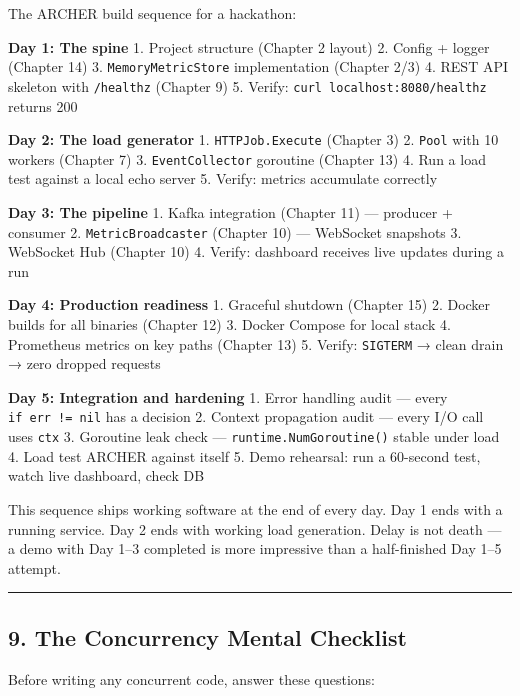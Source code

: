 \documentclass[
]{article}
\begin{document}
The ARCHER build sequence for a hackathon:

\textbf{Day 1: The spine} 1. Project structure (Chapter 2 layout) 2.
Config + logger (Chapter 14) 3. \texttt{MemoryMetricStore}
implementation (Chapter 2/3) 4. REST API skeleton with \texttt{/healthz}
(Chapter 9) 5. Verify: \texttt{curl\ localhost:8080/healthz} returns 200

\textbf{Day 2: The load generator} 1. \texttt{HTTPJob.Execute} (Chapter
3) 2. \texttt{Pool} with 10 workers (Chapter 7) 3.
\texttt{EventCollector} goroutine (Chapter 13) 4. Run a load test
against a local echo server 5. Verify: metrics accumulate correctly

\textbf{Day 3: The pipeline} 1. Kafka integration (Chapter 11) ---
producer + consumer 2. \texttt{MetricBroadcaster} (Chapter 10) ---
WebSocket snapshots 3. WebSocket Hub (Chapter 10) 4. Verify: dashboard
receives live updates during a run

\textbf{Day 4: Production readiness} 1. Graceful shutdown (Chapter 15)
2. Docker builds for all binaries (Chapter 12) 3. Docker Compose for
local stack 4. Prometheus metrics on key paths (Chapter 13) 5. Verify:
\texttt{SIGTERM} → clean drain → zero dropped requests

\textbf{Day 5: Integration and hardening} 1. Error handling audit ---
every \texttt{if\ err\ !=\ nil} has a decision 2. Context propagation
audit --- every I/O call uses \texttt{ctx} 3. Goroutine leak check ---
\texttt{runtime.NumGoroutine()} stable under load 4. Load test ARCHER
against itself 5. Demo rehearsal: run a 60-second test, watch live
dashboard, check DB

This sequence ships working software at the end of every day. Day 1 ends
with a running service. Day 2 ends with working load generation. Delay
is not death --- a demo with Day 1--3 completed is more impressive than
a half-finished Day 1--5 attempt.

\begin{center}\rule{0.5\linewidth}{0.5pt}\end{center}

\hypertarget{the-concurrency-mental-checklist}{%
\subsection{9. The Concurrency Mental
Checklist}\label{the-concurrency-mental-checklist}}

Before writing any concurrent code, answer these questions:
\end{document}

